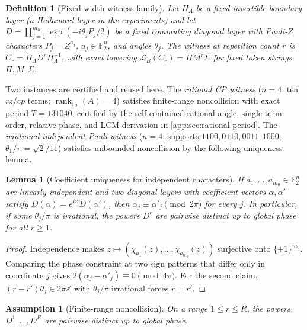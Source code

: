 \documentclass[a4paper,twocolumn,10pt,unpublished]{quantumarticle}
\newtheorem{definition}{Definition}
\newtheorem{lemma}{Lemma}
\newtheorem{assumption}{Assumption}
\newcommand{\Ftwo}{\mathbb{F}_2}
\begin{document}
\begin{definition}[Fixed-width witness family]
\label{def:witness-family}
Let $H_\Lambda$ be a fixed invertible boundary layer (a Hadamard layer in
the experiments) and let
$D = \prod_{j=1}^{m_0} \exp(-i\theta_j P_j/2)$
be a fixed commuting diagonal layer with Pauli-$Z$ characters
$P_j = Z^{a_j}$, $a_j \in \Ftwo^{n}$, and angles $\theta_j$. The witness
at repetition count $r$ is $C_r = H_\Lambda D^{r} H_\Lambda^{-1}$, with
exact lowering $\mathcal{L}_B(C_r) = \Pi M^r \Sigma$ for fixed token
strings $\Pi, M, \Sigma$.
\end{definition}

Two instances are certified and reused here. The
\emph{rational CP witness} ($n = 4$; ten $rz$/$cp$ terms;
$\operatorname{rank}_{\Ftwo}(A) = 4$) satisfies finite-range noncollision
with exact period $T = 131040$, certified by the self-contained rational
angle, single-term order, relative-phase, and LCM derivation in
\cref{app:sec:rational-period}. The
\emph{irrational independent-Pauli witness} ($n = 4$; supports
$1100, 0110, 0011, 1000$; $\theta_1/\pi = \sqrt{2}/11$) satisfies
unbounded noncollision by the following uniqueness lemma.

\begin{lemma}[Coefficient uniqueness for independent characters]
\label{lem:coeff-uniqueness}
If $a_1,\ldots,a_{m_0} \in \Ftwo^{n}$ are linearly independent and two
diagonal layers with coefficient vectors $\alpha, \alpha'$ satisfy
$D(\alpha) = e^{i\varphi} D(\alpha')$, then
$\alpha_j \equiv \alpha'_j \pmod{2\pi}$ for every $j$. In particular, if
some $\theta_j/\pi$ is irrational, the powers $D^{r}$ are pairwise
distinct up to global phase for all $r \geq 1$.
\end{lemma}

\begin{proof}
Independence makes
$z \mapsto (\chi_{a_1}(z),\ldots,\chi_{a_{m_0}}(z))$ surjective onto
$\{\pm 1\}^{m_0}$. Comparing the phase constraint at two sign patterns
that differ only in coordinate $j$ gives
$2(\alpha_j - \alpha'_j) \equiv 0 \pmod{4\pi}$. For the second claim,
$(r-r')\theta_j \in 2\pi\mathbb{Z}$ with $\theta_j/\pi$ irrational forces
$r = r'$.
\end{proof}

\begin{assumption}[Finite-range noncollision]
\label{ass:noncollision}
On a range $1 \leq r \leq R$, the powers $D^1,\ldots,D^R$ are pairwise
distinct up to global phase.
\end{assumption}
\end{document}
